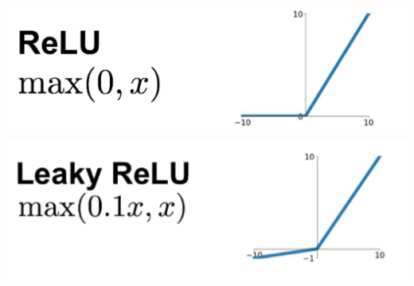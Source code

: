 \documentclass[11pt, a4paper]{article}
\begin{document}
\begin{spacing}{1.1}
	\hspace*{24mm} \includegraphics[scale=0.3]{relu} \hspace*{13mm} \includegraphics[scale=0.3]{leaky_relu} \newpage


\end{spacing}
\end{document}
